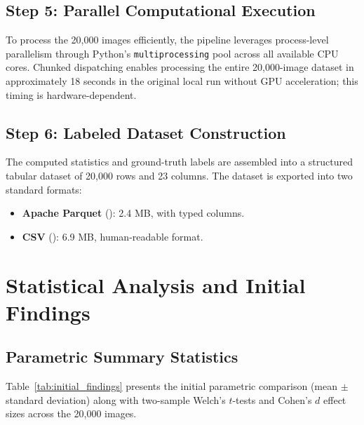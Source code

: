 \documentclass[11pt,a4paper]{article}
\begin{document}
\subsection{Step 5: Parallel Computational Execution}
To process the 20,000 images efficiently, the pipeline leverages process-level parallelism through Python's \texttt{multiprocessing} pool across all available CPU cores. Chunked dispatching enables processing the entire 20,000-image dataset in approximately 18 seconds in the original local run without GPU acceleration; this timing is hardware-dependent.

\subsection{Step 6: Labeled Dataset Construction}
The computed statistics and ground-truth labels are assembled into a structured tabular dataset of 20,000 rows and 23 columns. The dataset is exported into two standard formats:
\begin{itemize}[noitemsep]
    \item \textbf{Apache Parquet} (): 2.4 MB, with typed columns.
    \item \textbf{CSV} (): 6.9 MB, human-readable format.
\end{itemize}

\section{Statistical Analysis and Initial Findings}

\subsection{Parametric Summary Statistics}
Table~\ref{tab:initial_findings} presents the initial parametric comparison (mean $\pm$ standard deviation) along with two-sample Welch's $t$-tests and Cohen's $d$ effect sizes across the 20,000 images.
\end{document}
